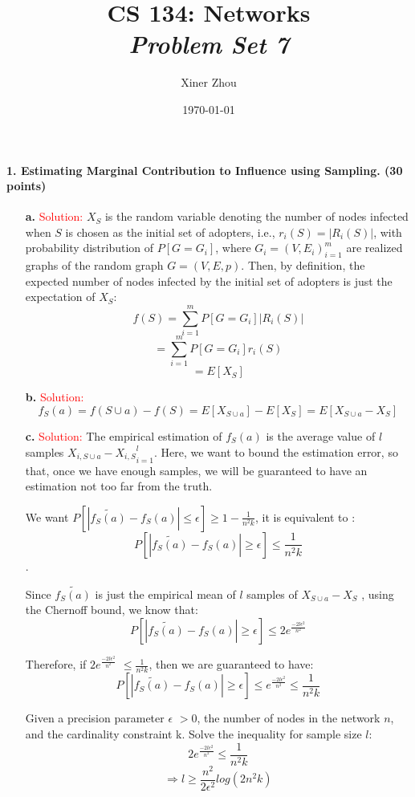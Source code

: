 \documentclass[11pt]{article} %
\title{CS 134: Networks \\ \emph{Problem Set 7}}
\author{Xiner Zhou}
\date{\today} %
\begin{document}
 
\maketitle
   
\paragraph{1. Estimating Marginal Contribution to Influence using Sampling. (30 points)} 

\begin{itemize}
\item[\textbf{a.}] 
\textcolor{red}{Solution:} $X_S$ is the random variable denoting the number of nodes infected when $S$ is chosen as the initial set of adopters, i.e., $r_i(S)=|R_i(S)|$, with probability distribution of $P[G=G_i]$, where ${G_{i}=(V,E_i)}_{i=1}^{m}$ are realized graphs of the random graph $G=(V,E,p)$. Then, by definition, the expected number of nodes infected by the initial set of adopters is just the expectation of $X_S$: 
$$f(S)=\sum_{i=1}^{m} P[G=G_i] |R_i(S)|$$
$$=\sum_{i=1}^{m} P[G=G_i] r_i(S)$$
$$=E[X_S]$$
		
\item[\textbf{b.} ]  
\textcolor{red}{Solution:}
$$f_S(a)=f(S \cup a)-f(S)=E[X_{S \cup a}]-E[X_{S}]=E[X_{S \cup a} - X_{S}]$$
		
\item[\textbf{c.} ]  
\textcolor{red}{Solution:}	
The empirical estimation of $f_S(a)$ is the average value of $l$ samples ${X_{i, S \cup a} - X_{i, S}}_{i=1}^{l}$. Here, we want to bound the estimation error, so that, once we have enough samples, we will be guaranteed to have an estimation not too far from the truth.

We want $P[|\widetilde{f_S(a)}-f_S(a)| \le \epsilon] \ge 1-\frac{1}{n^2 k}$, it is equivalent to :
$$ P[|\widetilde{f_S(a)}-f_S(a)| \ge \epsilon] \le  \frac{1}{n^2 k} $$.

Since $\widetilde{f_S(a)}$ is just the empirical mean of $l$ samples of $X_{S \cup a} - X_{S}$ , using the Chernoff bound, we know that: 
$$ P[|\widetilde{f_S(a)}-f_S(a)| \ge \epsilon] \le 2 e^{\frac{-2l\epsilon^2}{n^2}} $$

Therefore, if $2 e^{\frac{-2 l \epsilon^2}{n^2}} $ $\le  \frac{1}{n^2 k}$, then we are guaranteed to have:
$$ P[|\widetilde{f_S(a)}-f_S(a)| \ge \epsilon] \le   e^{\frac{-2 l \epsilon^2}{n^2}}  \le \frac{1}{n^2 k} $$

Given a precision parameter $ \epsilon$ $ > 0$, the number of nodes in the network $n$, and the cardinality constraint k. Solve the inequality for sample size $l$:
$$2 e^{\frac{-2 l \epsilon^2}{n^2}} \le  \frac{1}{n^2 k}$$
$$ \Rightarrow l \ge \frac{n^2}{2 \epsilon^2} log(2 n^2 k) $$


\end{itemize}
\end{document}
